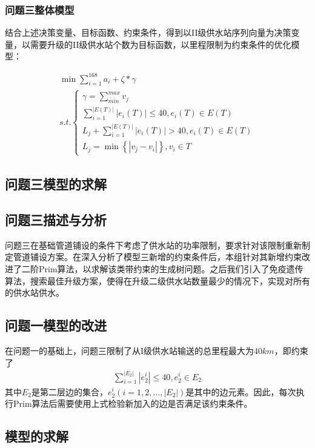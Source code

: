 \documentclass{whutmod}
\begin{document}
        \subsubsection{问题三整体模型}
        结合上述决策变量、目标函数、约束条件，得到以II级供水站序列向量为决策变量，以需要升级的II级供水站个数为目标函数，以里程限制为约束条件的优化模型：
        
        \begin{gather}
        \min \sum_{i=1}^{168}a_i+\zeta*\gamma\\
        s.t.
        \left\{\begin{matrix}
        \gamma=\displaystyle\sum_{min}^{max}v_j
        \\
        \displaystyle\sum_{i=1}^{|E(T)|}|e_i(T)|\leq40,e_i(T)\in E(T)
        \\ 
        L_j+\displaystyle\sum_{i=1}^{|E(T)|}|e_i(T)|> 40,e_i(T)\in E(T)
        \\
        L_j=\min\left\{ |v_j-v_i|\right\},v_i \in T
        \end{matrix}\right.
        \end{gather}
        \subsection{问题三模型的求解}

   		\subsection{问题三描述与分析}
   		问题三在基础管道铺设的条件下考虑了供水站的功率限制，要求针对该限制重新制定管道铺设方案。在深入分析了模型三新增的约束条件后，本组针对其新增约束改进了二阶Prim算法，以求解该类带约束的生成树问题。之后我们引入了免疫遗传算法，搜索最佳升级方案，使得在升级二级供水站数量最少的情况下，实现对所有的供水站供水。
    	\subsection{问题一模型的改进}
    	在问题一的基础上，问题三限制了从I级供水站输送的总里程最大为$40km$，即约束了
    	\begin{gather*}
    	\sum_{i=1}^{|E_2|}|e_2^i|\leq 40,e_2^i\in E_2
    	\end{gather*}
    	其中$E_2$是第二层边的集合，$e_2^i(i=1,2,...,|E_2|)$是其中的边元素。因此，每次执行Prim算法后需要使用上式检验新加入的边是否满足该约束条件。
    	\subsection{模型的求解}
\end{document}
